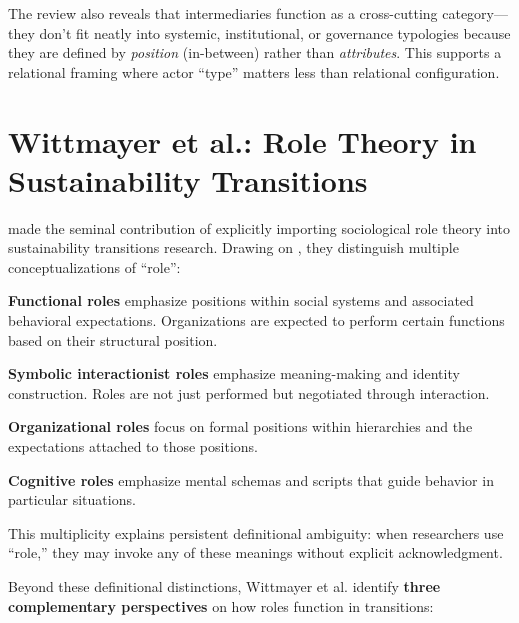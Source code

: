 \documentclass[../main.tex]{subfiles}
\begin{document}
The review also reveals that intermediaries function as a cross-cutting category---they don't fit neatly into systemic, institutional, or governance typologies because they are defined by \textit{position} (in-between) rather than \textit{attributes}. This supports a relational framing where actor ``type'' matters less than relational configuration.


\section{Wittmayer et al.: Role Theory in Sustainability Transitions}

\textcite{wittmayer2017roles} made the seminal contribution of explicitly importing sociological role theory into sustainability transitions research. Drawing on \textcite{biddle1986role}, they distinguish multiple conceptualizations of ``role'':

\textbf{Functional roles} emphasize positions within social systems and associated behavioral expectations. Organizations are expected to perform certain functions based on their structural position.

\textbf{Symbolic interactionist roles} emphasize meaning-making and identity construction. Roles are not just performed but negotiated through interaction.

\textbf{Organizational roles} focus on formal positions within hierarchies and the expectations attached to those positions.

\textbf{Cognitive roles} emphasize mental schemas and scripts that guide behavior in particular situations.

This multiplicity explains persistent definitional ambiguity: when researchers use ``role,'' they may invoke any of these meanings without explicit acknowledgment.

Beyond these definitional distinctions, Wittmayer et al. identify \textbf{three complementary perspectives} on how roles function in transitions:
\end{document}
